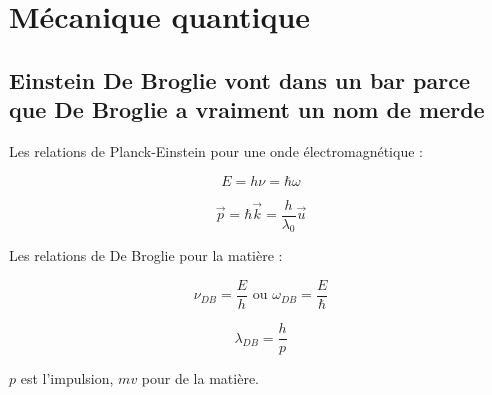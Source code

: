 \documentclass[a4paper,12pt]{book}
\newcommand{\Thr}[2]{\begin{tcolorbox}[sharp corners, colback=white,colframe=red!10!blue!30!green!75!, title=Théorème : #1]#2\end{tcolorbox}}
\renewcommand{\Vec}[1]{\overrightarrow{#1}}
\begin{document}
\section{Mécanique quantique}
\subsection{Einstein De Broglie vont dans un bar parce que De Broglie a vraiment un nom de merde}
\Thr{Planck-Einstein et De Broglie}{Les relations de Planck-Einstein pour une onde électromagnétique :
\par $$E = h\nu = \hbar\omega$$
\par $$\Vec{p} = \hbar\Vec{k} = \frac{h}{\lambda_0}\Vec{u}$$
\par Les relations de De Broglie pour la matière :
\par $$\nu_{DB} = \frac{E}{h}\text{ ou }\omega_{DB} = \frac{E}{\hbar}$$
\par $$\lambda_{DB} = \frac{h}{p}$$}
$p$ est l'impulsion, $mv$ pour de la matière.
\end{document}
